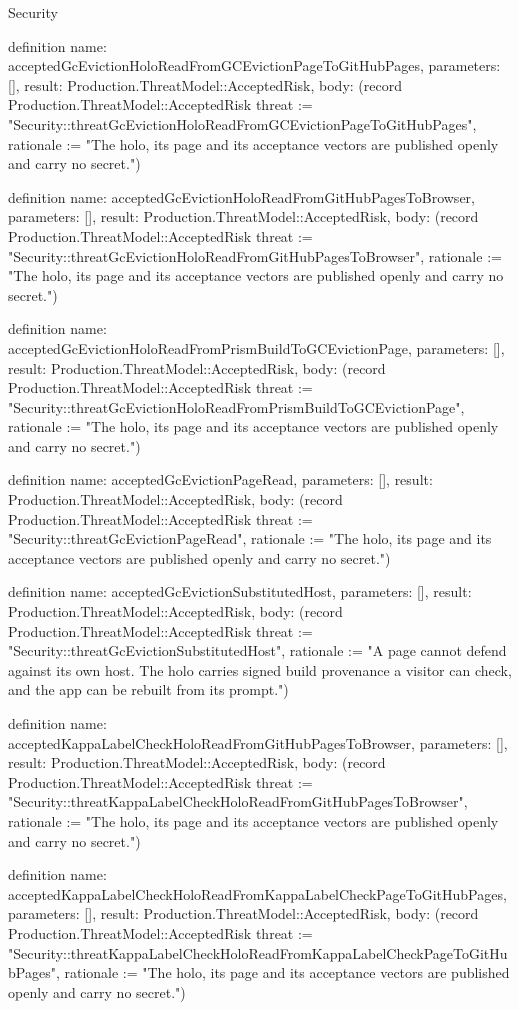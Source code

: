 \begin{lexlean}{Security}
\begin{semanticmodule}
definition{
  name: acceptedGcEvictionHoloReadFromGCEvictionPageToGitHubPages,
  parameters: [],
  result: Production.ThreatModel::AcceptedRisk,
  body: (record Production.ThreatModel::AcceptedRisk {threat := "Security::threatGcEvictionHoloReadFromGCEvictionPageToGitHubPages", rationale := "The holo, its page and its acceptance vectors are published openly and carry no secret."})
}

definition{
  name: acceptedGcEvictionHoloReadFromGitHubPagesToBrowser,
  parameters: [],
  result: Production.ThreatModel::AcceptedRisk,
  body: (record Production.ThreatModel::AcceptedRisk {threat := "Security::threatGcEvictionHoloReadFromGitHubPagesToBrowser", rationale := "The holo, its page and its acceptance vectors are published openly and carry no secret."})
}

definition{
  name: acceptedGcEvictionHoloReadFromPrismBuildToGCEvictionPage,
  parameters: [],
  result: Production.ThreatModel::AcceptedRisk,
  body: (record Production.ThreatModel::AcceptedRisk {threat := "Security::threatGcEvictionHoloReadFromPrismBuildToGCEvictionPage", rationale := "The holo, its page and its acceptance vectors are published openly and carry no secret."})
}

definition{
  name: acceptedGcEvictionPageRead,
  parameters: [],
  result: Production.ThreatModel::AcceptedRisk,
  body: (record Production.ThreatModel::AcceptedRisk {threat := "Security::threatGcEvictionPageRead", rationale := "The holo, its page and its acceptance vectors are published openly and carry no secret."})
}

definition{
  name: acceptedGcEvictionSubstitutedHost,
  parameters: [],
  result: Production.ThreatModel::AcceptedRisk,
  body: (record Production.ThreatModel::AcceptedRisk {threat := "Security::threatGcEvictionSubstitutedHost", rationale := "A page cannot defend against its own host. The holo carries signed build provenance a visitor can check, and the app can be rebuilt from its prompt."})
}

definition{
  name: acceptedKappaLabelCheckHoloReadFromGitHubPagesToBrowser,
  parameters: [],
  result: Production.ThreatModel::AcceptedRisk,
  body: (record Production.ThreatModel::AcceptedRisk {threat := "Security::threatKappaLabelCheckHoloReadFromGitHubPagesToBrowser", rationale := "The holo, its page and its acceptance vectors are published openly and carry no secret."})
}

definition{
  name: acceptedKappaLabelCheckHoloReadFromKappaLabelCheckPageToGitHubPages,
  parameters: [],
  result: Production.ThreatModel::AcceptedRisk,
  body: (record Production.ThreatModel::AcceptedRisk {threat := "Security::threatKappaLabelCheckHoloReadFromKappaLabelCheckPageToGitHubPages", rationale := "The holo, its page and its acceptance vectors are published openly and carry no secret."})
}


\end{semanticmodule}
\end{lexlean}
